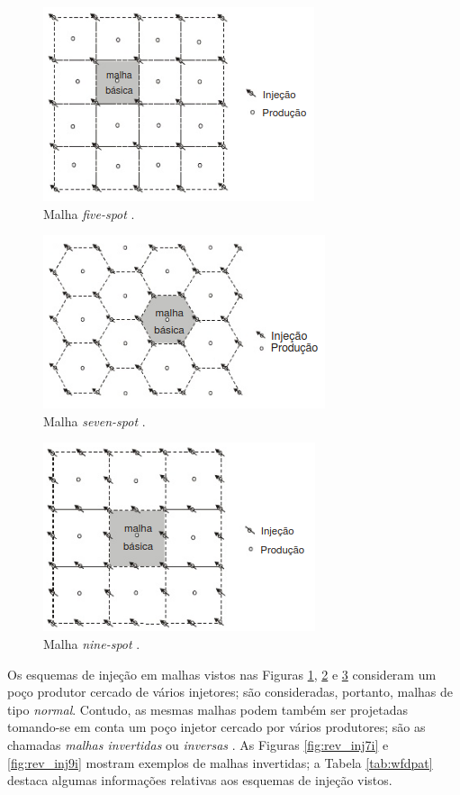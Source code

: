 \begin{figure}[!ht]
\centering
\includegraphics[width=.6\textwidth]{figs/revisao/revisao_inj5s.png}
\caption{Malha \textit{five-spot} \cite[p. 568]{engres}.}
\label{fig:rev_inj5s}
\end{figure}

\begin{figure}[!ht]
\centering
\includegraphics[width=.6\textwidth]{figs/revisao/revisao_inj7s.png}
\caption{Malha \textit{seven-spot} \cite[p. 568]{engres}.}
\label{fig:rev_inj7s}
\end{figure}

\begin{figure}[!ht]
\centering
\includegraphics[width=.6\textwidth]{figs/revisao/revisao_inj9s.png}
\caption{Malha \textit{nine-spot} \cite[p. 568]{engres}.}
\label{fig:rev_inj9s}
\end{figure}

Os esquemas de inje\c{c}\~{a}o em malhas vistos nas Figuras \ref{fig:rev_inj5s}, \ref{fig:rev_inj7s} e \ref{fig:rev_inj9s} consideram um po\c{c}o produtor cercado de v\'{a}rios injetores; s\~{a}o consideradas, portanto, malhas de tipo \textit{normal}. Contudo, as mesmas malhas podem tamb\'{e}m ser projetadas tomando-se em conta um po\c{c}o injetor cercado por v\'{a}rios produtores; s\~{a}o as chamadas \textit{malhas invertidas} ou \textit{inversas} \cite[p. 569]{engres}. As Figuras \ref{fig:rev_inj7i} e \ref{fig:rev_inj9i} mostram exemplos de malhas invertidas; a Tabela \ref{tab:wfdpat} destaca algumas informa\c{c}\~{o}es relativas aos esquemas de inje\c{c}\~{a}o vistos.

